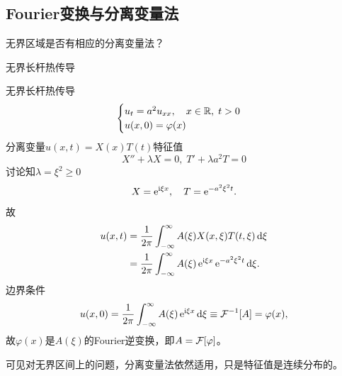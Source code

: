 \subsection{Fourier变换与分离变量法}
无界区域是否有相应的分离变量法？
\begin{example}{无界长杆热传导}{}
	
	无界长杆热传导
	\begin{align*}
		\begin{cases}
			u_t = a^2u_{xx},\quad x \in \mathbb{R},\;t > 0\\
			u(x,0) = \varphi(x)
		\end{cases}
	\end{align*}
	分离变量$u(x,t) = X(x)T(t)$特征值
	\[
		X'' + \lambda X = 0,\;T' + \lambda a^2T = 0
	\]
	讨论知$\lambda = \xi^2 \geqslant 0$
	\[
		X = \mathop{}\!\mathrm{e}^{\mathrm{i}\xi x},\quad T = \mathop{}\!\mathrm{e}^{-a^2\xi^2t}.
	\]
	故
	\begin{align*}
		u(x,t) &= \frac1{2\pi}\int_{-\infty}^\infty A(\xi)X(x,\xi)T(t,\xi)\mathop{}\!\mathrm{d}\xi\\
		&= \frac1{2\pi}\int_{-\infty}^\infty A(\xi)\mathop{}\!\mathrm{e}^{\mathrm{i}\xi x}\mathop{}\!\mathrm{e}^{-a^2\xi^2t}\mathop{}\!\mathrm{d}\xi.
	\end{align*}
	边界条件
	\[
		u(x,0) = \frac1{2\pi}\int_{-\infty}^\infty A(\xi)\mathop{}\!\mathrm{e}^{\mathrm{i}\xi x}\mathop{}\!\mathrm{d}\xi \equiv \operatorname{\mathcal{F}}^{-1}[A] = \varphi(x),
	\]
	故$\varphi(x)$是$A(\xi)$的Fourier逆变换，即$A = \operatorname{\mathcal{F}}[\varphi]$。
\end{example}
可见对无界区间上的问题，分离变量法依然适用，只是特征值是连续分布的。
